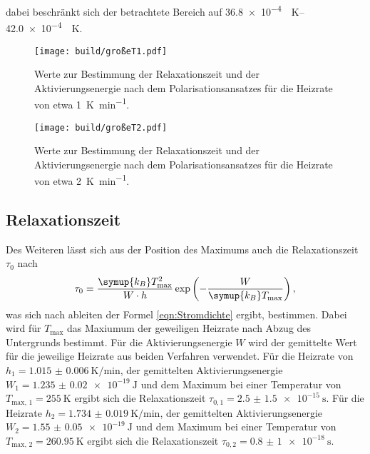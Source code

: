 dabei beschränkt sich der betrachtete Bereich auf \SIrange{36.8e-4}{42.0e-4}{\per\kelvin}.
\begin{figure}[htb]
  \centering
  \texttt{[image: build/großeT1.pdf]}
  \caption{Werte zur Bestimmung der Relaxationszeit und der Aktivierungsenergie nach dem Polarisationsansatzes für die Heizrate von etwa \SI{1}{\kelvin\per\minute}.}
  \label{fig:grT1}
\end{figure}
\begin{figure}[htb]
  \centering
  \texttt{[image: build/großeT2.pdf]}
  \caption{Werte zur Bestimmung der Relaxationszeit und der Aktivierungsenergie nach dem Polarisationsansatzes für die Heizrate von etwa \SI{2}{\kelvin\per\minute}.}
  \label{fig:grT2}
\end{figure}

\subsection{Relaxationszeit}
\label{sec:relax}
Des Weiteren lässt sich aus der Position des Maximums auch die Relaxationszeit $\tau_0$ nach
\begin{equation}
    \label{eqn:tau0}
    \tau_0 = \frac{\symup{k_B}T_\text{max}^2}{W \cdot h} \exp\left(-\frac{W}{\symup{k_B}T_\text{max}} \right),
\end{equation}
was sich nach ableiten der Formel \eqref{eqn:Stromdichte} ergibt, bestimmen. Dabei wird für $T_\text{max}$ das Maxiumum der geweiligen Heizrate nach Abzug des Untergrunds bestimmt.
Für die Aktivierungsenergie $W$ wird der gemittelte Wert für die jeweilige Heizrate aus beiden Verfahren verwendet.
Für die Heizrate von $h_1=\SI{1.015(6)}{\kelvin\per\minute}$, der gemittelten Aktivierungsenergie $W_1 = \SI{1.235(20)e-19}{\joule}$ und dem 
Maximum bei einer Temperatur von $T_\text{max, 1} = \SI{255}{\kelvin}$ ergibt sich die Relaxationszeit $\tau_{0,1} = \SI{2.5(15)e-15}{\second}$. 
Für die Heizrate $h_2=\SI{1.734(19)}{\kelvin\per\minute}$, der gemittelten Aktivierungsenergie $W_2 = \SI{1.55(5)e-19}{\joule}$ und dem 
Maximum bei einer Temperatur von $T_\text{max, 2} = \SI{260.95}{\kelvin}$ ergibt sich die Relaxationszeit $\tau_{0,2} = \SI{0.8(10)e-18}{\second}$.


\FloatBarrier